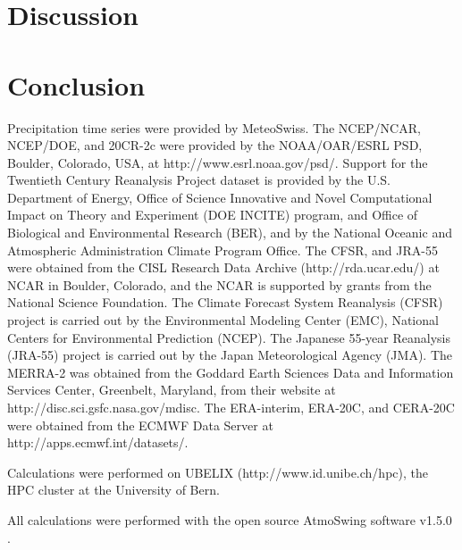 \documentclass{ametsoc}
\begin{document}
\section{Discussion}


\section{Conclusion}


%
\acknowledgments
Precipitation time series were provided by MeteoSwiss. The NCEP/NCAR, NCEP/DOE, and 20CR-2c were provided by the NOAA/OAR/ESRL PSD, Boulder, Colorado, USA, at http://www.esrl.noaa.gov/psd/. Support for the Twentieth Century Reanalysis Project dataset is provided by the U.S. Department of Energy, Office of Science Innovative and Novel Computational Impact on Theory and Experiment (DOE INCITE) program, and Office of Biological and Environmental Research (BER), and by the National Oceanic and Atmospheric Administration Climate Program Office. The CFSR, and JRA-55 were obtained from the CISL Research Data Archive (http://rda.ucar.edu/) at NCAR in Boulder, Colorado, and the NCAR is supported by grants from the National Science Foundation. The Climate Forecast System Reanalysis (CFSR) project is carried out by the Environmental Modeling Center (EMC), National Centers for Environmental Prediction (NCEP). The Japanese 55-year Reanalysis (JRA-55) project is carried out by the Japan Meteorological Agency (JMA). The MERRA-2 was obtained from the Goddard Earth Sciences Data and Information Services Center, Greenbelt, Maryland, from their website at http://disc.sci.gsfc.nasa.gov/mdisc. The ERA-interim, ERA-20C, and CERA-20C were obtained from the ECMWF Data Server at http://apps.ecmwf.int/datasets/. 

Calculations were performed on UBELIX (http://www.id.unibe.ch/hpc), the HPC cluster at the University of Bern.

All calculations were performed with the open source AtmoSwing software v1.5.0 \citep{Horton2017a}.


%

\end{document}
